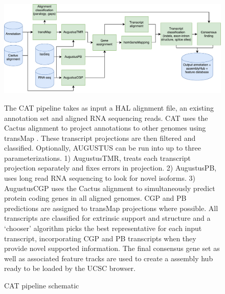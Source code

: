 \documentclass[fleqn,10pt]{wlscirep}
\begin{document}

\clearpage

\begin{figure}
\centering
\includegraphics[width=\textwidth,height=\textheight,keepaspectratio]{CAT.pdf}
\caption{CAT pipeline schematic}
The CAT pipeline takes as input a HAL alignment file, an existing annotation set and aligned RNA sequencing reads. CAT uses the Cactus alignment to project annotations to other genomes using transMap \cite{stanke2008using}. These transcript projections are then filtered and classified. Optionally, AUGUSTUS can be run into up to three parameterizations. 1) AugustusTMR, treats each transcript projection separately and fixes errors in projection. 2) AugustusPB, uses long read RNA sequencing to look for novel isoforms. 3) AugustusCGP \cite{konig2015simultaneous} uses the Cactus alignment to simultaneously predict protein coding genes in all aligned genomes. CGP and PB predictions are assigned to transMap projections where possible. All transcripts are classified for extrinsic support and structure and a ‘chooser’ algorithm picks the best representative for each input transcript, incorporating CGP and PB transcripts when they provide novel supported information. The final consensus gene set as well as associated feature tracks are used to create a assembly hub ready to be loaded by the UCSC browser.
\label{fig:fig1}
\end{figure}
\end{document}
